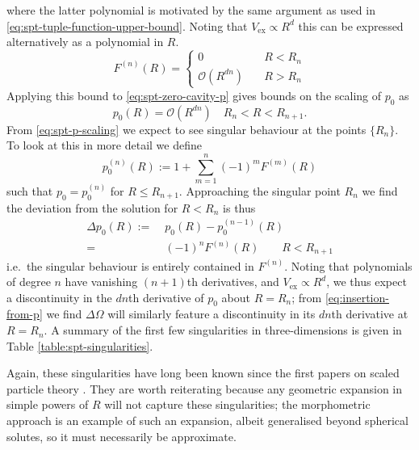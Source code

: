 \documentclass[11pt,twoside]{report}
\begin{document}
where the latter polynomial is motivated by the same argument as used in \eqref{eq:spt-tuple-function-upper-bound}.
Noting that $V_\mathrm{ex} \propto R^d$ this can be expressed alternatively as a polynomial in $R$.
\begin{equation*}
  F^{(n)}(R) =
  \begin{cases}
    0 & \quad R < R_n \\
    \mathcal{O}\left( R^{dn} \right) & \quad R > R_n
  \end{cases}
\end{equation*}
Applying this bound to \eqref{eq:spt-zero-cavity-p} gives bounds on the scaling of $p_0$ as
\begin{equation}\label{eq:spt-p-scaling}
  p_0(R) =
  \mathcal{O}\left( R^{dn} \right)
  \quad R_n < R < R_{n+1}.
\end{equation}
From \eqref{eq:spt-p-scaling} we expect to see singular behaviour at the points $\{R_n\}$.
To look at this in more detail we define
\begin{equation*}
  p_0^{(n)}(R) := 1 + \sum_{m=1}^n (-1)^m F^{(m)}(R)
\end{equation*}
such that $p_0 = p_0^{(n)}$ for $R \le R_{n+1}$.
Approaching the singular point $R_n$ we find the deviation from the solution for $R < R_n$ is thus
\begin{equation*}
  \begin{split}
    \Delta p_0(R) :=& \;
    p_0(R) - p_0^{(n-1)}(R)
    \\ =& \;
    (-1)^n F^{(n)}(R)
    \qquad R < R_{n+1}
  \end{split}
\end{equation*}
i.e.\ the singular behaviour is entirely contained in $F^{(n)}$.
Noting that polynomials of degree $n$ have vanishing $(n+1)$th derivatives, and $V_\mathrm{ex} \propto R^d$, we thus expect a discontinuity in the $dn$th derivative of $p_0$ about $R=R_n$; from \eqref{eq:insertion-from-p} we find $\Delta \Omega$ will similarly feature a discontinuity in its $dn$th derivative at $R=R_n$.
A summary of the first few singularities in three-dimensions is given in Table \ref{table:spt-singularities}.

Again, these singularities have long been known since the first papers on scaled particle theory \cite{ReissJCP1959,ReissJCP1960}.
They are worth reiterating because any geometric expansion in simple powers of $R$ will not capture these singularities; the morphometric approach is an example of such an expansion, albeit generalised beyond spherical solutes, so it must necessarily be approximate.
\end{document}
